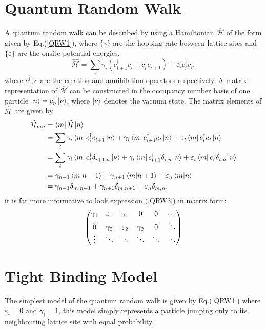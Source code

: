 \documentclass{article}
\numberwithin{equation}{section}
\renewcommand{\H}{\mathcal{\hat{H}}}
\newcommand{\1}{\mathbb{1}}
\newcommand{\annihilation}{c^{}}
\newcommand{\creation}{c^{\dagger}}
\begin{document}
\section{Quantum Random Walk}
A quantum random walk can be described by using a Hamiltonian $\H$ of the form given by Eq.(\ref{QRW1}), where $\{\gamma\}$ are the hopping rate between lattice sites and $\{\varepsilon\}$ are the onsite potential energies.
\begin{equation}\label{QRW1}
    \H=\sum_{i}\gamma^{}_i(\creation_{i+1}\annihilation_i+\creation_{i}\annihilation_{i+1})+\varepsilon^{}_i\creation_i\annihilation_i,
\end{equation}
where $\creation,\annihilation$ are the creation and annihilation operators respectively.
A matrix representation of $\H$ can be constructed in the occupancy number basis of one particle $\ket{n}=\creation_n\ket{\nu}$, where $\ket{\nu}$ denotes the vacuum state. The matrix elements of $\H$ are given by
\begin{align}\label{QRW2}
    \H_{mn}&=\bra{m}\H\ket{n}
    \\
    &=\sum_i \gamma_i\bra{m}\creation_{i}\annihilation_{i+1}\ket{n} +\gamma_i\bra{m}\creation_{i+1}\annihilation_{i}\ket{n} + \varepsilon^{}_i\bra{m}\creation_{i}\annihilation_{i}\ket{n} 
    \\
    &= \sum_i \gamma_i\bra{m}\creation_{i}\delta^{}_{i+1,n}\ket{\nu}
    +\gamma_i\bra{m}\creation_{i+1}\delta^{}_{i,n}\ket{\nu} +
    \varepsilon^{}_i\bra{m}\creation_{i}\delta^{}_{i,n}\ket{\nu} 
    \\
    &= \gamma_{n-1}\bra{m}\ket{n-1}+\gamma_{n+1}\bra{m}\ket{n+1}+\varepsilon_n\bra{m}\ket{n}
    \\
    &=\gamma_{n-1}\delta_{m,n-1}+\gamma_{n+1}\delta_{m,n+1}+\varepsilon_n\delta_{m,n}, \label{QRW3}
\end{align}
it is far more informative to look expression (\ref{QRW3}) in matrix form:
\begin{equation}
    \mqty(
    \gamma_1 & \varepsilon_1 & \gamma_1 & 0 & 0 &\cdots 
    \\
    0 & \gamma_2 & \varepsilon_2 & \gamma_2 & 0&\ddots
    \\
    \vdots & \ddots & \ddots & \ddots  & \ddots &\ddots
    )
\end{equation}
\section{Tight Binding Model}
The simplest model of the quantum random walk is given by Eq.(\ref{QRW1}) where $\varepsilon_i=0$ and $\gamma_i=1$, this model simply represents a particle jumping only to its neighbouring lattice site with equal probability.
\end{document}
